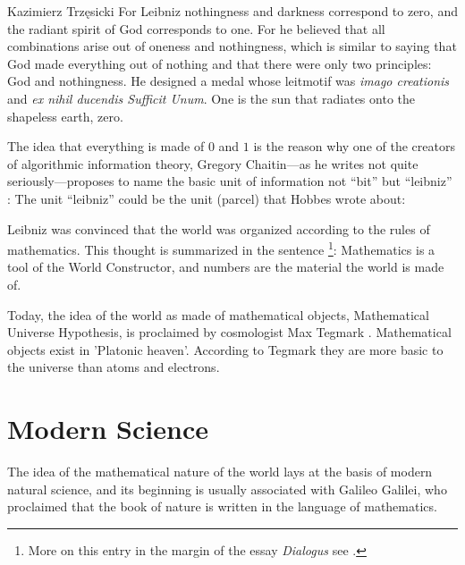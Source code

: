 \begin{artengenv}{Kazimierz Trzęsicki}
For Leibniz \parencite*{list1697} nothingness and darkness correspond to zero, and the radiant spirit of God corresponds to one. For he believed that all combinations arise out of oneness and nothingness, which is similar to saying that God made everything out of nothing and that there were only two principles: God and nothingness. He designed a medal whose leitmotif was \emph{imago creationis} and \emph{ex nihil ducendis Sufficit Unum}. One is the sun that radiates onto the shapeless earth, zero.

The idea that everything is made of $0$ and $1$ is the reason why one of the creators of algorithmic information theory, Gregory Chaitin---as he writes not quite seriously---proposes to name the basic unit of information not ``bit'' but ``leibniz'' \parencites{Chaitin2004}[cf.][]{Trzesicki2006a}:
The unit ``leibniz'' could be the unit (parcel) that Hobbes \parencite*[Chapter V. Of Reason, and Science]{Hobbes1651} wrote about:


Leibniz was convinced that the world was organized according to the rules of mathematics. This thought is summarized in the sentence \parencite*[p.191] {Leibniz1677}\footnote{More on this entry in the margin of the essay \emph{Dialogus} \parencite{Leibniz1677} see \parencite{Kopania2018}.}:
Mathematics is a tool of the World Constructor, and numbers are the material the world is made of.


Today, the idea of the world as made of mathematical objects, Mathematical Universe Hypothesis, is proclaimed by cosmologist Max Tegmark \parencite*{Tegmark2008,Tegmark2014}. Mathematical objects exist in 'Platonic heaven'. According to Tegmark they are more basic to the universe than atoms and electrons.


\section{Modern Science} 

The idea of the mathematical nature of the world lays at the basis of modern natural science, and its beginning is usually associated with Galileo Galilei, who proclaimed that the book of nature is written in the language of mathematics.


\end{artengenv}
